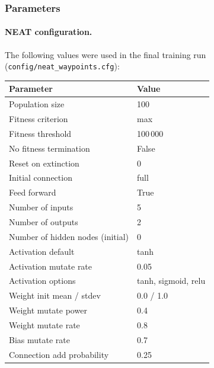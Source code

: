 \documentclass[a4paper]{article}
\begin{document}
\subsubsection{Parameters}
\label{subsubsec:waypoints-parameters}

\paragraph{NEAT configuration.}
The following values were used in the final training run
(\texttt{config/neat\_waypoints.cfg}):

\begin{center}
\begin{tabular}{ll}
\toprule
\textbf{Parameter} & \textbf{Value} \\ \midrule
Population size                   & 100            \\
Fitness criterion                 & max            \\
Fitness threshold                 & 100\,000       \\
No fitness termination            & False          \\
Reset on extinction               & 0              \\
Initial connection                & full           \\
Feed forward                      & True           \\
Number of inputs                  & 5              \\
Number of outputs                 & 2              \\
Number of hidden nodes (initial)  & 0              \\
Activation default                & tanh           \\
Activation mutate rate            & 0.05           \\
Activation options                & tanh, sigmoid, relu \\
\midrule
Weight init mean / stdev          & 0.0 / 1.0      \\
Weight mutate power               & 0.4            \\
Weight mutate rate                & 0.8            \\
Bias mutate rate                  & 0.7            \\
\midrule
Connection add probability        & 0.25           \\

\end{tabular}
\end{center}
\end{document}
